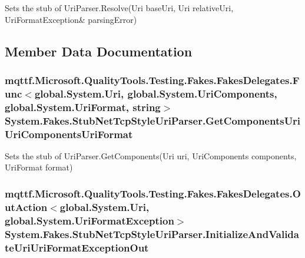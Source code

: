 Sets the stub of Uri\-Parser.\-Resolve(Uri base\-Uri, Uri relative\-Uri, Uri\-Format\-Exception\& parsing\-Error)



\subsection{Member Data Documentation}
\hypertarget{class_system_1_1_fakes_1_1_stub_net_tcp_style_uri_parser_afd884e12e9cdd38572d4d6a5d1846bf9}{
\subsubsection[{Get\-Components\-Uri\-Uri\-Components\-Uri\-Format}]{\setlength{\rightskip}{0pt plus 5cm}mqttf.\-Microsoft.\-Quality\-Tools.\-Testing.\-Fakes.\-Fakes\-Delegates.\-Func$<$global.\-System.\-Uri, global.\-System.\-Uri\-Components, global.\-System.\-Uri\-Format, string$>$ System.\-Fakes.\-Stub\-Net\-Tcp\-Style\-Uri\-Parser.\-Get\-Components\-Uri\-Uri\-Components\-Uri\-Format}}\label{class_system_1_1_fakes_1_1_stub_net_tcp_style_uri_parser_afd884e12e9cdd38572d4d6a5d1846bf9}


Sets the stub of Uri\-Parser.\-Get\-Components(\-Uri uri, Uri\-Components components, Uri\-Format format)

\hypertarget{class_system_1_1_fakes_1_1_stub_net_tcp_style_uri_parser_a54be5e99746fbcfba238174a12727384}{
\subsubsection[{Initialize\-And\-Validate\-Uri\-Uri\-Format\-Exception\-Out}]{\setlength{\rightskip}{0pt plus 5cm}mqttf.\-Microsoft.\-Quality\-Tools.\-Testing.\-Fakes.\-Fakes\-Delegates.\-Out\-Action$<$global.\-System.\-Uri, global.\-System.\-Uri\-Format\-Exception$>$ System.\-Fakes.\-Stub\-Net\-Tcp\-Style\-Uri\-Parser.\-Initialize\-And\-Validate\-Uri\-Uri\-Format\-Exception\-Out}}\label{class_system_1_1_fakes_1_1_stub_net_tcp_style_uri_parser_a54be5e99746fbcfba238174a12727384}


